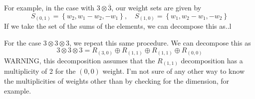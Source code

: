 For example, in the case with $ 3 \otimes \overline{3} $, 
our weight sets are given by 
\[
	S_{ \left( 0 , 1  \right) } = \left\{  
	w _ 2 , w_1  - w_2 ,  - w_1 \right\}, \quad 
	S _{ \left( 1, 0  \right)  }  = \left\{  
	w_1 , w_2 - w_1,  - w_2 \right\} 
\] If we take the set of the sums of the elements, we can 
decompose this as..l

For the case $ 3 \otimes 3 \otimes 3 $, 
we repeat this same procedure. 
We can decompose this as 
 \[
 3 \otimes 3 \otimes 3  = 
 R_{ \left( 3, 0  \right)  } \oplus R_{ \left( 1, 1  \right)  }
 \oplus R _{ \left( 1, 1 \right) } \oplus R_{ \left( 0 , 0  \right) }
\]
WARNING, this decomposition 
assumes that the $ R _{ \left( 1, 1 \right)  }$ 
decomposition has a multiplicity of 2 
for the $ \left( 0 , 0  \right) $ weight.
I'm not sure of any other way to 
know the multiplicities of weights 
other than by checking for the dimension, for example. 


